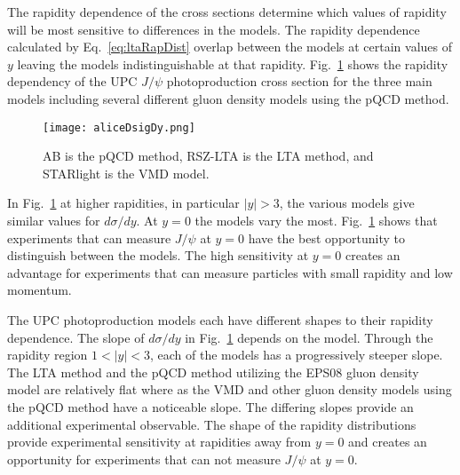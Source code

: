   The rapidity dependence of the cross sections determine which values of 
    rapidity will be most sensitive to differences in the models. 
  The rapidity dependence calculated by Eq.~\ref{eq:ltaRapDist} overlap between 
    the models at certain values of $y$ leaving the models indistinguishable at
    that rapidity.
  Fig.~\ref{fig:rapDepAll} \cite{alice2012.09} shows the rapidity dependency of 
    the UPC $J/\psi$ photoproduction cross section for the three main models 
    including several different gluon density models using the pQCD method.
  \begin{figure}[h] 
    \begin{center}
      \texttt{[image: aliceDsigDy.png]}
    \end{center}
    \caption{ \label{fig:rapDepAll} AB is the pQCD method, RSZ-LTA is the LTA method, and STARlight
      is the VMD model.}
  \end{figure}
  In Fig.~\ref{fig:rapDepAll} at higher rapidities, in particular $|y|>3$, the 
    various models give similar values for $d\sigma/dy$. 
  At $y=0$ the models vary the most. 
  Fig.~\ref{fig:rapDepAll} shows that experiments that can measure $J/\psi$
    at $y=0$ have the best opportunity to distinguish between the models.
  The high sensitivity at $y=0$ creates an advantage for experiments that can 
    measure particles with small rapidity and low momentum.  
 
  The UPC photoproduction models each have different shapes to their rapidity 
    dependence. 
  The slope of $d\sigma/dy$ in Fig.~\ref{fig:rapDepAll} depends on the model. 
  Through the rapidity region $1<|y|<3$, each of the models has a progressively
    steeper slope. 
  The LTA method and the pQCD method utilizing the EPS08 gluon density model 
    are relatively flat where as the VMD and other gluon density models using
    the pQCD method have a noticeable slope.
  The differing slopes provide an additional experimental observable. 
  The shape of the rapidity distributions provide experimental sensitivity at 
    rapidities away from $y=0$ and creates an opportunity for experiments that 
    can not measure $J/\psi$ at $y=0$.

